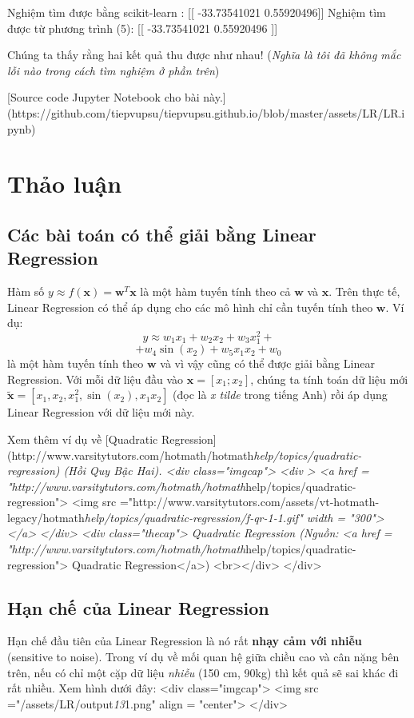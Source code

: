     Nghiệm tìm được bằng scikit-learn  :  [[  -33.73541021 0.55920496]]
    Nghiệm tìm được từ phương trình (5):  [[  -33.73541021 0.55920496 ]]


Chúng ta thấy rằng hai kết quả thu được như nhau! (\textit{Nghĩa là tôi đã không mắc lỗi nào trong cách tìm nghiệm ở phần trên})

[Source code Jupyter Notebook cho bài này.](https://github.com/tiepvupsu/tiepvupsu.github.io/blob/master/assets/LR/LR.ipynb)



\section{Thảo luận}

\subsection{Các bài toán có thể giải bằng Linear Regression}Hàm số $y \approx f(\mathbf{x})= \mathbf{w}^T\mathbf{x}$ là một hàm tuyến tính theo cả $ \mathbf{w}$ và $\mathbf{x}$. Trên thực tế, Linear Regression có thể áp dụng cho các mô hình chỉ cần tuyến tính theo $\mathbf{w}$. Ví dụ:
$$
y \approx w_1 x_1 + w_2 x_2 + w_3 x_1^2 + 
$$
$$
+w_4 \sin(x_2) + w_5 x_1x_2 + w_0
$$
là một hàm tuyến tính theo $\mathbf{w}$ và vì vậy cũng có thể được giải bằng Linear Regression. Với mỗi dữ liệu đầu vào $\mathbf{x}=[x_1; x_2] $, chúng ta tính toán dữ liệu mới $\tilde{\mathbf{x}} = [x_1, x_2, x_1^2, \sin(x_2), x_1x_2]$ (đọc là \textit{x tilde} trong tiếng Anh) rồi áp dụng Linear Regression với dữ liệu mới này. 

Xem thêm ví dụ về [Quadratic Regression](http://www.varsitytutors.com/hotmath/hotmath\textit{help/topics/quadratic-regression) (Hồi Quy Bậc Hai).
<div class="imgcap">
<div >
<a href = "http://www.varsitytutors.com/hotmath/hotmath}help/topics/quadratic-regression">
    <img src ="http://www.varsitytutors.com/assets/vt-hotmath-legacy/hotmath\textit{help/topics/quadratic-regression/f-qr-1-1.gif"  width = "300"></a>
</div>
<div class="thecap"> Quadratic Regression (Nguồn: <a href = "http://www.varsitytutors.com/hotmath/hotmath}help/topics/quadratic-regression"> Quadratic Regression</a>) <br></div>
</div>


\subsection{Hạn chế của Linear Regression}
Hạn chế đầu tiên của Linear Regression là nó rất \textbf{nhạy cảm với nhiễu} (sensitive to noise). Trong ví dụ về mối quan hệ giữa chiều cao và cân nặng bên trên, nếu có chỉ
một cặp dữ liệu \textit{nhiễu} (150 cm, 90kg) thì kết quả sẽ sai khác đi rất nhiều. Xem hình dưới đây:
<div class="imgcap">
<img src ="/assets/LR/output\textit{13}1.png" align = "center">
</div>

